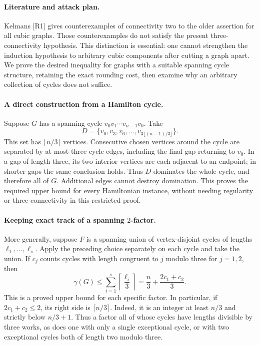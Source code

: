 \documentclass[11pt,a4paper]{article}
\begin{document}
\paragraph{Literature and attack plan.}
Kelmans [R1] gives counterexamples of connectivity two to the older
assertion for all cubic graphs. Those counterexamples do not satisfy
the present three-connectivity hypothesis. This distinction is essential:
one cannot strengthen the induction hypothesis to arbitrary cubic
components after cutting a graph apart. We prove the desired inequality
for graphs with a suitable spanning cycle structure, retaining the exact
rounding cost, then examine why an arbitrary collection of cycles does
not suffice.

\paragraph{A direct construction from a Hamilton cycle.}
Suppose $G$ has a spanning cycle $v_0v_1\cdots v_{n-1}v_0$.
Take
\[
 D=\{v_0,v_3,v_6,\ldots,v_{3\lfloor(n-1)/3\rfloor}\}.
\]
This set has $\lceil n/3\rceil$ vertices. Consecutive chosen vertices
around the cycle are separated by at most three cycle edges, including
the final gap returning to $v_0$. In a gap of length three, its two
interior vertices are each adjacent to an endpoint; in shorter gaps
the same conclusion holds. Thus $D$ dominates the whole cycle, and
therefore all of $G$. Additional edges cannot destroy domination.
This proves the required upper bound for every Hamiltonian instance,
without needing regularity or three-connectivity in this restricted proof.

\paragraph{Keeping exact track of a spanning $2$-factor.}
More generally, suppose $F$ is a spanning union of vertex-disjoint
cycles of lengths $\ell_1,\ldots,\ell_s$. Apply the preceding choice
separately on each cycle and take the union. If $c_j$ counts cycles
with length congruent to $j$ modulo three for $j=1,2$, then
\[
 \gamma(G)\le\sum_{i=1}^s\left\lceil\frac{\ell_i}{3}\right\rceil
 =\frac n3+\frac{2c_1+c_2}{3}.
\]
This is a proved upper bound for each specific factor. In particular,
if $2c_1+c_2\le2$, its right side is $\lceil n/3\rceil$.
Indeed, it is an integer at least $n/3$ and strictly below $n/3+1$.
Thus a factor all of whose cycles have lengths divisible by three
works, as does one with only a single exceptional cycle, or with
two exceptional cycles both of length two modulo three.
\end{document}
